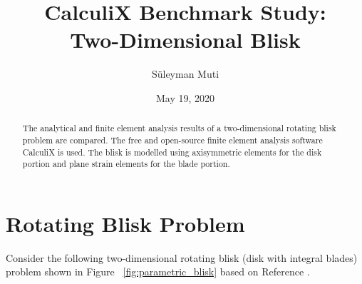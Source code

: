 \documentclass[12pt, a4paper, twoside]{article}
\title{CalculiX Benchmark Study:\\Two-Dimensional Blisk}
\author{Süleyman Muti}
\date{May 19, 2020}
\begin{document}
\maketitle


\begin{abstract}	
The analytical and finite element analysis results of a two-dimensional rotating blisk problem are compared. The free and open-source finite element analysis software CalculiX is used. The blisk is modelled using axisymmetric elements for the disk portion and plane strain elements for the blade portion.
\end{abstract}


\section{Rotating Blisk Problem}

Consider the following two-dimensional rotating blisk (disk with integral blades) problem shown in Figure ~\ref{fig:parametric_blisk} based on Reference \cite{rotors_book}. 
\end{document}

